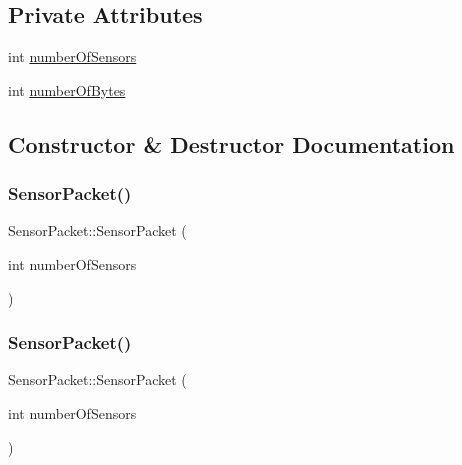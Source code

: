 \subsection*{Private Attributes}
\begin{DoxyCompactItemize}
\item 
int \mbox{\hyperlink{class_sensor_packet_a10722ca574e0e8d7426e8b9f244cddd1}{number\+Of\+Sensors}}
\item 
int \mbox{\hyperlink{class_sensor_packet_a599bf8b4ce688afc5fcc915f0cef9cfc}{number\+Of\+Bytes}}
\end{DoxyCompactItemize}


\subsection{Constructor \& Destructor Documentation}
\mbox{\label{class_sensor_packet_a185c826ce5d740e863d78027905af153}} 
\subsubsection{\texorpdfstring{Sensor\+Packet()}{SensorPacket()}\hspace{0.1cm}{\footnotesize\ttfamily [1/2]}}
{\footnotesize\ttfamily Sensor\+Packet\+::\+Sensor\+Packet (\begin{DoxyParamCaption}\item[{int}]{number\+Of\+Sensors }\end{DoxyParamCaption})}

\mbox{\label{class_sensor_packet_a185c826ce5d740e863d78027905af153}} 
\subsubsection{\texorpdfstring{Sensor\+Packet()}{SensorPacket()}\hspace{0.1cm}{\footnotesize\ttfamily [2/2]}}
{\footnotesize\ttfamily Sensor\+Packet\+::\+Sensor\+Packet (\begin{DoxyParamCaption}\item[{int}]{number\+Of\+Sensors }\end{DoxyParamCaption})}




